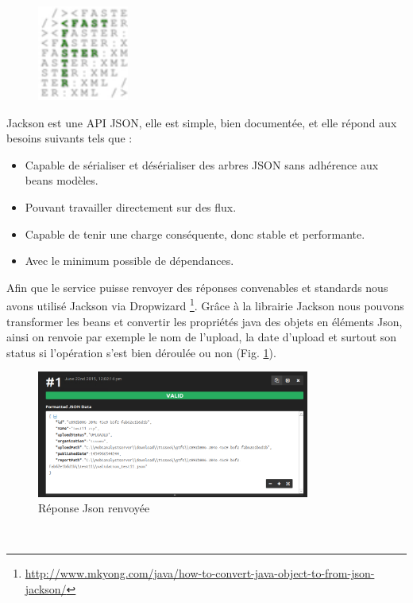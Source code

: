 \begin{itemize}
\begin{figure}
\centering
\includegraphics[width=3cm]{images/fxml_logo_Jackson.png}
\end{figure}
\noindent Jackson est une API JSON, elle est simple, bien documentée, et elle répond aux besoins suivants tels que :
\begin{itemize}
\item Capable de sérialiser et désérialiser des arbres JSON sans adhérence aux beans modèles.
\item Pouvant travailler directement sur des flux.
\item Capable de tenir une charge conséquente, donc stable et performante.
\item Avec le minimum possible de dépendances.
\end{itemize}

Afin que le service puisse renvoyer des réponses convenables et standards nous avons utilisé Jackson via Dropwizard \footnote{\url{http://www.mkyong.com/java/how-to-convert-java-object-to-from-json-jackson/}}. Grâce à la librairie Jackson nous pouvons transformer les \og beans \fg et convertir les propriétés java des objets en éléments Json, ainsi on renvoie par exemple le nom de l'upload, la date d'upload et surtout son status si l'opération s'est bien déroulée ou non (Fig. \ref{fig:Json1}).
\\
\begin{figure}[h]
	\centering
		\includegraphics[width=0.8\textwidth]{images/JsonFormatter_serialization.PNG}
	\caption{Réponse Json renvoyée}
	\label{fig:Json1}
\end{figure}\\


\end{itemize}
